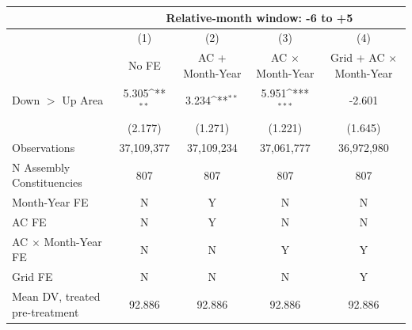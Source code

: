 {
\def\sym#1{\ifmmode^{#1}\else\(^{#1}\)\fi}
\begin{tabular}{l*{4}{c}}
\hline
&\multicolumn{4}{c}{Relative-month window: -6 to +5} \\ \hline
            &\multicolumn{1}{c}{(1)}&\multicolumn{1}{c}{(2)}&\multicolumn{1}{c}{(3)}&\multicolumn{1}{c}{(4)}\\
            &\multicolumn{1}{c}{No FE}&\multicolumn{1}{c}{AC + Month-Year}&\multicolumn{1}{c}{AC $\times$ Month-Year}&\multicolumn{1}{c}{Grid + AC $\times$ Month-Year}\\
\hline
Down $>$ Up Area&       5.305\sym{**} &       3.234\sym{**} &       5.951\sym{***}&      -2.601         \\
            &     (2.177)         &     (1.271)         &     (1.221)         &     (1.645)         \\
\hline
Observations&  37,109,377         &  37,109,234         &  37,061,777         &  36,972,980         \\
N Assembly Constituencies&         807         &         807         &         807         &         807         \\
Month-Year FE&           N         &           Y         &           N         &           N         \\
AC FE       &           N         &           Y         &           N         &           N         \\
AC $\times$ Month-Year FE&           N         &           N         &           Y         &           Y         \\
Grid FE     &           N         &           N         &           N         &           Y         \\
Mean DV, treated pre-treatment&      92.886         &      92.886         &      92.886         &      92.886         \\
\hline
\end{tabular}
}
